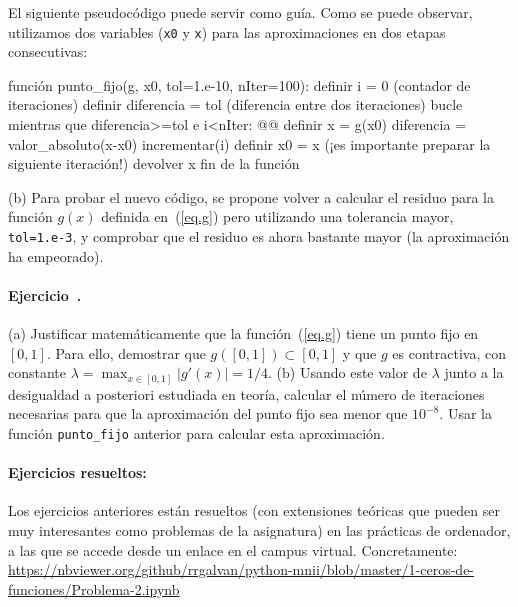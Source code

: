 \documentclass[12pt]{article}
\newcounter{ejercicio}
\newcommand{\ejercicio}{\stepcounter{ejercicio}\paragraph*{Ejercicio~\theejercicio.}}
\begin{document}
El siguiente pseudocódigo puede servir como guía. Como se puede observar, utilizamos dos variables (\texttt{x0} y \texttt{x}) para las aproximaciones en dos etapas consecutivas:
\begin{algorithm}
función punto_fijo(g, x0, tol=1.e-10, nIter=100):
  definir i = 0 (contador de iteraciones)
  definir diferencia = tol (diferencia entre dos iteraciones)
  bucle mientras que diferencia>=tol e i<nIter: @\label{loop.line}@
    definir x = g(x0)
    diferencia = valor_absoluto(x-x0)
    incrementar(i)
    definir x0 = x (¡es importante preparar la siguiente iteración!)
  devolver x
fin de la función
\end{algorithm}

(b) Para probar el nuevo código, se propone volver a calcular el residuo para la función $g(x)$ definida en~(\ref{eq.g}) pero utilizando una tolerancia mayor, \texttt{tol=1.e-3}, y comprobar que el residuo es ahora bastante mayor (la aproximación ha empeorado).

%

\ejercicio
(a) Justificar matemáticamente que la función~(\ref{eq.g}) tiene un punto fijo en $[0,1]$. Para ello, demostrar que $g([0,1])\subset [0,1]$ y que $g$ es contractiva, con constante $\lambda=\max_{x\in [0,1]}|g'(x)| = 1/4$. (b) Usando este valor de $\lambda$ junto a la desigualdad a posteriori estudiada en teoría, calcular el número de iteraciones necesarias para que la aproximación del punto fijo sea menor que $10^{-8}$. Usar la función \texttt{punto\_fijo} anterior para calcular esta aproximación.

\paragraph*{Ejercicios resueltos:} Los ejercicios anteriores están resueltos (con extensiones teóricas que pueden ser muy interesantes como problemas de la asignatura) en las prácticas de ordenador, a las que se accede desde un enlace en el campus virtual. Concretamente: \url{https://nbviewer.org/github/rrgalvan/python-mnii/blob/master/1-ceros-de-funciones/Problema-2.ipynb}
\end{document}

